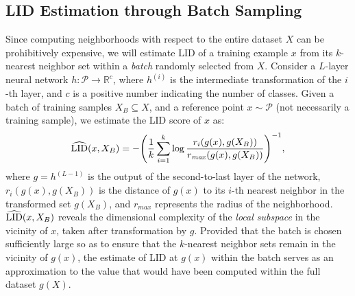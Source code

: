 \documentclass{article}
\begin{document}
\subsection{LID Estimation through Batch Sampling}\label{sec:lid_dnn}
Since computing neighborhoods with respect to the entire dataset $X$ can be prohibitively expensive, we will estimate LID of a training example $x$ from its $k$-nearest neighbor set within a \textit{batch} randomly selected from $X$.   
Consider a $L$-layer neural network $h:\mathcal{P} \rightarrow \mathbb{R}^c $, where $h^{(i)}$ is the intermediate transformation of the $i$-th layer, and $c$ is a positive number indicating the number of classes. Given a batch of training samples $X_{B}\subseteq X$, and a reference point $x \sim \mathcal{P}$ (not necessarily a training sample), we estimate the LID score of $x$ as:
\begin{equation} \label{eq:lid_training}
    \widehat{\textup{LID}}(x, X_B) = - \Bigg( \frac{1}{k}\sum_{i=1}^{k}\log \frac{r_i(g(x), g(X_{B}))}{r_{\mathit{max}}(g(x), g(X_{B}))}\Bigg)^{-1},
\end{equation}
where $g = h^{(L-1)}$ is the output of the second-to-last layer of the network, $r_i(g(x), g(X_{B}))$ is the distance of $g(x)$ to its $i$-th nearest neighbor in the transformed set $g(X_{B})$, and $r_{\mathit{max}}$ represents the radius of the neighborhood. $\widehat{\textup{LID}}(x, X_B)$ reveals the dimensional complexity of the {\em local subspace} in the vicinity of $x$, taken after transformation by $g$. Provided that the batch is chosen sufficiently large so as to ensure that the $k$-nearest neighbor sets remain in the vicinity of $g(x)$, the estimate of LID at $g(x)$ within the batch serves as an approximation to the value that would have been computed within the full dataset $g(X)$. 



\end{document}
